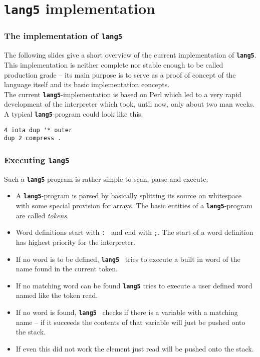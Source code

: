 \documentclass{beamer}
\newcommand*{\NIX}{\vspace*{.3cm}\\}
\newcommand*{\F}{{\tt\bf lang5}}
\begin{document}
 \section{\F{ } implementation}
  \begin{frame}[containsverbatim]
   \frametitle{The implementation of \F}
   The following slides give a short overview of the current implementation 
   of \F.
   \NIX
   This implementation is neither complete nor stable enough to be called
   production grade -- its main purpose is to serve as a proof of concept
   of the language itself and its basic implementation concepts.
   \NIX
   The current \F-implementation is based on Perl which led to a very
   rapid development of the interpreter which took, until now, only about two
   man weeks.
   \NIX
   A typical \F-program could look like this:
   \begin{verbatim}
4 iota dup '* outer 
dup 2 compress .
   \end{verbatim}
  \end{frame}
%
  \begin{frame}
   \frametitle{Executing \F}
   Such a \F-program is rather simple to scan, parse and execute:
   \begin{itemize}
    \item A \F-program is parsed by basically splitting its source on 
     whitespace with some special provision for arrays. The basic entities of 
     a \F-program are called \emph{tokens}.
    \item Word definitions start with {\tt :}{ } and end with {\tt ;}. 
     The start of a word definition has highest priority for the interpreter.
    \item If no word is to be defined, \F{ } tries to execute a built in 
     word of the name found in the current token.
    \item If no matching word can be found \F{ } tries to execute a user
     defined word named like the token read.
    \item If no word is found, \F{ } checks if there is a variable with a 
     matching name -- if it succeeds the contents of that variable will just be
     pushed onto the stack.
    \item If even this did not work the element just read will be pushed onto
     the stack.
   \end{itemize}
  \end{frame}
%
\end{document}
